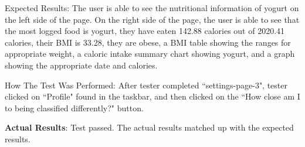 \documentclass[12pt, titlepage]{article}
\begin{document}
\begin{enumerate}
		Expected Results: The user is able to see the nutritional information of yogurt on the left side of the page. On the right side of the page, the user is able to see that the most logged food is yogurt, they have eaten 142.88 calories out of 2020.41 calories, their BMI is 33.28, they are obese, a BMI table showing the ranges for appropriate weight, a caloric intake summary chart showing yogurt, and a graph showing the appropriate date and calories.
		
		How The Test Was Performed: After tester completed ``settings-page-3", tester clicked on ``Profile" found in the taskbar, and then clicked on the ``How close am I to being classified differently?" button.
		
		\textbf{Actual Results}: Test passed. The actual results matched up with the expected results.
		
	\end{enumerate}
\end{document}
